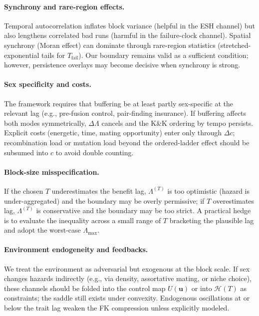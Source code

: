 \documentclass[11pt]{article}
\theoremstyle{upright}
\newcommand{\horizon}{\Lambda}
\newcommand{\Lmax}{\horizon^{(T)}_{\max}}
\newcommand{\hazT}[1]{\Lambda^{(#1)}}          %
\renewcommand{\Lmax}{\Lambda_{\max}}
\begin{document}
\paragraph{Synchrony and rare-region effects.}
Temporal autocorrelation inflates block variance (helpful in the ESH channel) but also lengthens correlated bad runs (harmful in the failure-clock channel). Spatial synchrony (Moran effect) can dominate through rare-region statistics (stretched-exponential tails for $T_{\mathrm{fail}}$). Our boundary remains valid as a sufficient condition; however, persistence overlays may become decisive when synchrony is strong.

\paragraph{Sex specificity and costs.}
The framework requires that buffering be at least partly sex-specific at the relevant lag (e.g., pre-fusion control, pair-finding insurance). If buffering affects both modes symmetrically, $\Delta\Lambda$ cancels and the K\&K ordering by tempo persists. Explicit costs (energetic, time, mating opportunity) enter only through $\Delta c$; recombination load or mutation load beyond the ordered-ladder effect should be subsumed into $c$ to avoid double counting.

\paragraph{Block-size misspecification.}
If the chosen $T$ underestimates the benefit lag, $\hazT{T}$ is too optimistic (hazard is under-aggregated) and the boundary may be overly permissive; if $T$ overestimates lag, $\hazT{T}$ is conservative and the boundary may be too strict. A practical hedge is to evaluate the inequality across a small range of $T$ bracketing the plausible lag and adopt the worst-case $\Lmax$.

\paragraph{Environment endogeneity and feedbacks.}
We treat the environment as adversarial but exogenous at the block scale. If sex changes hazards indirectly (e.g., via density, assortative mating, or niche choice), these channels should be folded into the control map $U(\mathbf u)$ or into $\mathcal H(T)$ as constraints; the saddle still exists under convexity. Endogenous oscillations at or below the trait lag weaken the FK compression unless explicitly modeled.
\end{document}
